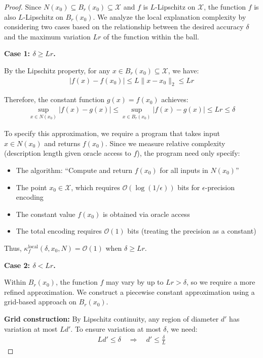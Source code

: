 \documentclass[11pt,letter,leqno]{article}
\begin{document}
\begin{proof}
Since $N(x_0) \subseteq B_r(x_0) \subseteq \mathcal{X}$ and $f$ is $L$-Lipschitz on $\mathcal{X}$, the function $f$ is also $L$-Lipschitz on $B_r(x_0)$. We analyze the local explanation complexity by considering two cases based on the relationship between the desired accuracy $\delta$ and the maximum variation $Lr$ of the function within the ball.

\textbf{Case 1: $\delta \geq Lr$.}

By the Lipschitz property, for any $x \in B_r(x_0) \subseteq \mathcal{X}$, we have:
\begin{align}
|f(x) - f(x_0)| \leq L \|x - x_0\|_2 \leq Lr
\end{align}

Therefore, the constant function $g(x) = f(x_0)$ achieves:
\begin{align}
\sup_{x \in N(x_0)} |f(x) - g(x)| \leq \sup_{x \in B_r(x_0)} |f(x) - g(x)| \leq Lr \leq \delta
\end{align}

To specify this approximation, we require a program that takes input $x \in N(x_0)$ and returns $f(x_0)$. Since we measure relative complexity (description length given oracle access to $f$), the program need only specify:
\begin{itemize}
\item The algorithm: ``Compute and return $f(x_0)$ for all inputs in $N(x_0)$''
\item The point $x_0 \in \mathcal{X}$, which requires $\mathcal{O}(\log(1/\epsilon))$ bits for $\epsilon$-precision encoding
\item The constant value $f(x_0)$ is obtained via oracle access
\item The total encoding requires $\mathcal{O}(1)$ bits (treating the precision as a constant)
\end{itemize}

Thus, $\kappa_f^{\text{local}}(\delta, x_0, N) = \mathcal{O}(1)$ when $\delta \geq Lr$.

\textbf{Case 2: $\delta < Lr$.}

Within $B_r(x_0)$, the function $f$ may vary by up to $Lr > \delta$, so we require a more refined approximation. We construct a piecewise constant approximation using a grid-based approach on $B_r(x_0)$.

\textbf{Grid construction:} By Lipschitz continuity, any region of diameter $d'$ has variation at most $Ld'$. To ensure variation at most $\delta$, we need:
\begin{align}
Ld' \leq \delta \quad \Rightarrow \quad d' \leq \frac{\delta}{L}
\end{align}


\end{proof}
\end{document}
